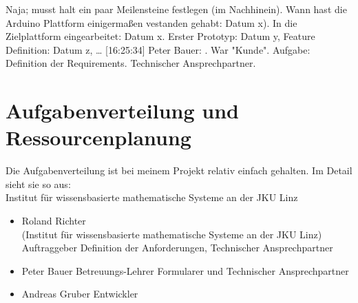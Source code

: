 Naja; musst halt ein paar Meilensteine festlegen (im Nachhinein). 
Wann hast die Arduino Plattform einigermaßen vestanden gehabt: Datum x).
In die Zielplattform eingearbeitet: Datum x. Erster Prototyp: Datum y, Feature Definition: Datum z, …
[16:25:34] Peter Bauer: . War "Kunde". Aufgabe: Definition der Requirements. Technischer Ansprechpartner.


\section{Aufgabenverteilung und Ressourcenplanung}
Die Aufgabenverteilung ist bei meinem Projekt relativ einfach gehalten.
Im Detail sieht sie so aus: \\
Institut für wissensbasierte mathematische Systeme an der JKU Linz
\begin{itemize}
\item Roland Richter \\ (Institut für wissensbasierte mathematische Systeme an der JKU Linz)
\subitem Auftraggeber
\subitem Definition der Anforderungen, Technischer Ansprechpartner
\item Peter Bauer
\subitem Betreuungs-Lehrer
\subitem Formularer und Technischer Ansprechpartner
\item Andreas Gruber
\subitem Entwickler
\end{itemize}

